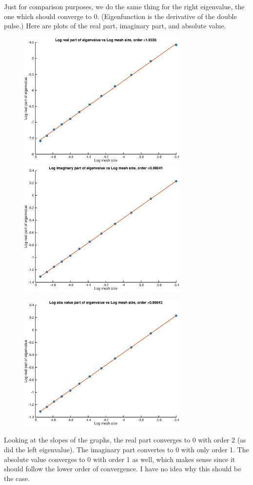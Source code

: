 \documentclass[12pt]{article}
\begin{document}
Just for comparison purposes, we do the same thing for the right eigenvalue, the one which should converge to 0. (Eigenfunction is the derivative of the double pulse.) Here are plots of the real part, imaginary part, and absolute value.
\begin{figure}[H]
\includegraphics[width=8.5cm]{double2logplotright2real.eps}
\includegraphics[width=8.5cm]{double2logplotright2imag.eps}
\end{figure}
\begin{figure}[H]
\includegraphics[width=8.5cm]{double2logplotright2abs.eps}
\end{figure}
Looking at the slopes of the graphs, the real part converges to 0 with order 2 (as did the left eigenvalue). The imaginary part convertes to 0 with only order 1. The absolute value converges to 0 with order 1 as well, which makes sense since it should follow the lower order of convergence. I have no idea why this should be the case.\\
\end{document}
